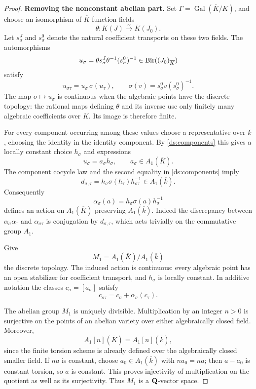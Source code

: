\begin{proof}
\smallskip\noindent\textbf{Removing the nonconstant abelian part.}\enspace
Set $\Gamma=\operatorname{Gal}(\overline K/K)$, and choose an
isomorphism of $\overline K$-function fields
\[
 \theta:\overline K(J)\xrightarrow{\sim}\overline K(J_0).
\]
Let $s_\sigma^J$ and $s_\sigma^0$ denote the natural coefficient
transports on these two fields.  The automorphisms
\[
 u_\sigma=\theta s_\sigma^J\theta^{-1}(s_\sigma^0)^{-1}
       \in\operatorname{Bir}((J_0)_{\overline K})
\]
satisfy
\begin{equation}
 u_{\sigma\tau}=u_\sigma\,\sigma(u_\tau),
 \qquad
 \sigma(v)=s_\sigma^0v(s_\sigma^0)^{-1}.
 \label{ds:cocycle-law}
\end{equation}
The map $\sigma\mapsto u_\sigma$ is continuous when the algebraic
points have the discrete topology: the rational maps defining
$\theta$ and its inverse use only finitely many algebraic
coefficients over $K$.  Its image is therefore finite.

For every component occurring among these values choose a
representative over $\overline k$, choosing the identity in the
identity component.  By \eqref{ds:components} this gives a locally
constant choice $h_\sigma$ and expressions
\[
 u_\sigma=a_\sigma h_\sigma,
 \qquad a_\sigma\in A_1(\overline K).
\]
The component cocycle law and the second equality in
\eqref{ds:components} imply
\[
 d_{\sigma,\tau}
   =h_\sigma\sigma(h_\tau)h_{\sigma\tau}^{-1}
   \in A_1(\overline k).
\]
Consequently
\[
 \alpha_\sigma(a)=h_\sigma\sigma(a)h_\sigma^{-1}
\]
defines an action on $A_1(\overline K)$ preserving
$A_1(\overline k)$.  Indeed the discrepancy between
$\alpha_\sigma\alpha_\tau$ and $\alpha_{\sigma\tau}$ is
conjugation by $d_{\sigma,\tau}$, which acts trivially on the
commutative group $A_1$.

Give
\[
 M_1=A_1(\overline K)/A_1(\overline k)
\]
the discrete topology.  The induced action is continuous: every
algebraic point has an open stabilizer for coefficient transport,
and $h_\sigma$ is locally constant.  In additive notation the
classes $c_\sigma=[a_\sigma]$ satisfy
\begin{equation}
 c_{\sigma\tau}=c_\sigma+\alpha_\sigma(c_\tau).
 \label{ds:additive-cocycle}
\end{equation}

The abelian group $M_1$ is uniquely divisible.  Multiplication by
an integer $n>0$ is surjective on the points of an abelian variety
over either algebraically closed field.  Moreover,
\[
 A_1[n](\overline K)=A_1[n](\overline k),
\]
since the finite torsion scheme is already defined over the
algebraically closed smaller field.  If $na$ is constant, choose
$a_0\in A_1(\overline k)$ with $na_0=na$; then $a-a_0$ is constant
torsion, so $a$ is constant.  This proves injectivity of
multiplication on the quotient as well as its surjectivity.
Thus $M_1$ is a $\mathbf Q$-vector space.


\end{proof}
